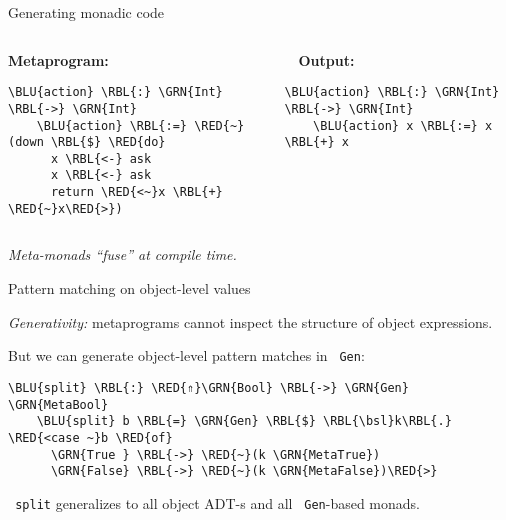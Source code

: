 \documentclass[dvipsnames,aspectratio=169]{beamer}
\theoremstyle{remark}
\newcommand{\RED}[1]{{\color{BrickRed} #1}}
\newcommand{\GRN}[1]{{\color{OliveGreen} #1}}
\newcommand{\RBL}[1]{{\color{RoyalBlue} #1}}
\newcommand{\BLU}[1]{{\color{Blue} #1}}
\newcommand{\bsl}{\textbackslash}
\begin{document}
\begin{frame}[fragile]{Generating monadic code}

\begin{columns}
\begin{column}{0.4\textwidth}
\textbf{Metaprogram:}
\begin{Verbatim}[commandchars=\\\{\}]
    \BLU{action} \RBL{:} \GRN{Int} \RBL{->} \GRN{Int}
    \BLU{action} \RBL{:=} \RED{~}(down \RBL{$} \RED{do}
      x \RBL{<-} ask
      x \RBL{<-} ask
      return \RED{<~}x \RBL{+} \RED{~}x\RED{>})
\end{Verbatim}
\end{column}

\begin{column}{0.5\textwidth}
\textbf{$\hspace{1em}$Output:}
\begin{Verbatim}[commandchars=\\\{\}]
    \BLU{action} \RBL{:} \GRN{Int} \RBL{->} \GRN{Int}
    \BLU{action} x \RBL{:=} x \RBL{+} x



\end{Verbatim}
\end{column}
\end{columns}
\vspace{2em}

\emph{Meta-monads ``fuse'' at compile time.}

\end{frame}

\begin{frame}[fragile]{Pattern matching on object-level values}

\emph{Generativity:} metaprograms cannot inspect the structure of object expressions.
\vspace{1em}

But we can generate object-level pattern matches in \texttt{\GRN{Gen}}:
\vspace{0.5em}
\begin{Verbatim}[commandchars=\\\{\}]
    \BLU{split} \RBL{:} \RED{⇑}\GRN{Bool} \RBL{->} \GRN{Gen} \GRN{MetaBool}
    \BLU{split} b \RBL{=} \GRN{Gen} \RBL{$} \RBL{\bsl}k\RBL{.} \RED{<case ~}b \RED{of}
      \GRN{True } \RBL{->} \RED{~}(k \GRN{MetaTrue})
      \GRN{False} \RBL{->} \RED{~}(k \GRN{MetaFalse})\RED{>}
\end{Verbatim}

\vspace{1em}
\texttt{\BLU{split}} generalizes to all object ADT-s and all \texttt{\GRN{Gen}}-based monads.

\end{frame}
\end{document}
